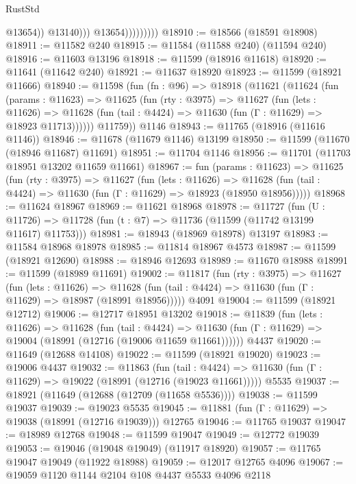 \begin{lexlean}{RustStd}
\begin{coremodule}
                                @13654))
                            @13140)))
                      @13654)))))))))
@18910 := @18566 (@18591 @18908)
@18911 := @11582 @240
@18915 := @11584 (@11588 @240) (@11594 @240)
@18916 := @11603 @13196
@18918 := @11599 (@18916 @11618)
@18920 := @11641 (@11642 @240)
@18921 := @11637 @18920
@18923 := @11599 (@18921 @11666)
@18940 := @11598
    (fun (fn : @96) =>
    @18918
      (@11621
        (@11624
          (fun (params : @11623) =>
          @11625
            (fun (rty : @3975) =>
            @11627
              (fun (lets : @11626) =>
              @11628 (fun (tail : @4424) => @11630 (fun (Γ : @11629) => @18923 @11713))))))
        @11759))
    @1146
@18943 := @11765 (@18916 (@11616 @1146))
@18946 := @11678 (@11679 @1146) @13199
@18950 := @11599 (@11670 (@18946 @11687) @11691)
@18951 := @11704 @1146
@18956 := @11701 (@11703 @18951 @13202 @11659 @11661)
@18967 := fun (params : @11623) =>
  @11625
    (fun (rty : @3975) =>
    @11627
      (fun (lets : @11626) =>
      @11628 (fun (tail : @4424) => @11630 (fun (Γ : @11629) => @18923 (@18950 @18956)))))
@18968 := @11624 @18967
@18969 := @11621 @18968
@18978 := @11727
    (fun (U : @11726) => @11728 (fun (t : @7) => @11736 (@11599 (@11742 @13199 @11617) @11753)))
@18981 := @18943 (@18969 @18978) @13197
@18983 := @11584 @18968 @18978
@18985 := @11814 @18967 @4573
@18987 := @11599 (@18921 @12690)
@18988 := @18946 @12693
@18989 := @11670 @18988
@18991 := @11599 (@18989 @11691)
@19002 := @11817
    (fun (rty : @3975) =>
    @11627
      (fun (lets : @11626) =>
      @11628 (fun (tail : @4424) => @11630 (fun (Γ : @11629) => @18987 (@18991 @18956)))))
    @4091
@19004 := @11599 (@18921 @12712)
@19006 := @12717 @18951 @13202
@19018 := @11839
    (fun (lets : @11626) =>
    @11628
      (fun (tail : @4424) =>
      @11630 (fun (Γ : @11629) => @19004 (@18991 (@12716 (@19006 @11659 @11661))))))
    @4437
@19020 := @11649 (@12688 @14108)
@19022 := @11599 (@18921 @19020)
@19023 := @19006 @4437
@19032 := @11863
    (fun (tail : @4424) => @11630 (fun (Γ : @11629) => @19022 (@18991 (@12716 (@19023 @11661)))))
    @5535
@19037 := @18921 (@11649 (@12688 (@12709 (@11658 @5536))))
@19038 := @11599 @19037
@19039 := @19023 @5535
@19045 := @11881 (fun (Γ : @11629) => @19038 (@18991 (@12716 @19039))) @12765
@19046 := @11765 @19037
@19047 := @18989 @12768
@19048 := @11599 @19047
@19049 := @12772 @19039
@19053 := @19046 (@19048 @19049) (@11917 @18920)
@19057 := @11765 @19047 @19049 (@11922 @18988)
@19059 := @12017 @12765 @4096
@19067 := @19059 @1120 @1144 @2104 @108 @4437 @5533 @4096 @2118

\end{coremodule}
\end{lexlean}
